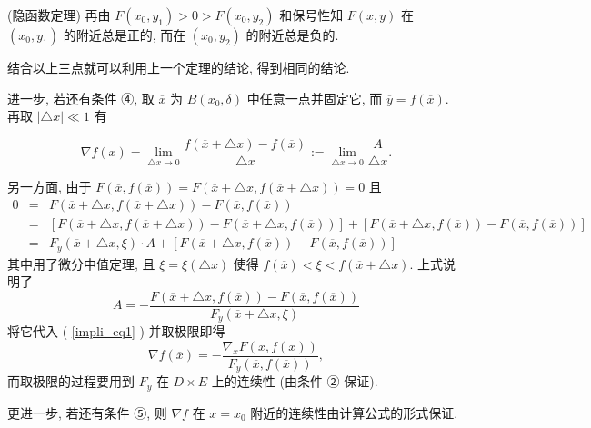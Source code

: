 \begin{theorem}{(隐函数定理)}
再由 $F(x_{0},y_{1})>0>F(x_{0},y_{2})$ 和保号性知 $F(x,y)$ 在 $(x_{0},y_{1})$
的附近总是正的, 而在 $(x_{0},y_{2})$ 的附近总是负的. 

结合以上三点就可以利用上一个定理的结论, 得到相同的结论. 

进一步, 若还有条件 ④, 取 \textbf{$\overline{x}$ }为 $B(x_{0},\delta)$ 中任意一点并固定它,
而 $\overline{y}=f(\overline{x})$. 再取 $\left|\triangle x\right|\ll1$
有

\begin{equation}\label{impli_eq1}
\nabla f(x)={\displaystyle {\displaystyle \lim_{\triangle x\rightarrow0}}\frac{f(\overline{x}+\triangle x)-f(\overline{x})}{\triangle x}:={\displaystyle \lim_{\triangle x\rightarrow0}}\frac{A}{\triangle x}}.
\end{equation}

另一方面, 由于 $F(\overline{x},f(\overline{x}))=F(\overline{x}+\triangle x,f(\overline{x}+\triangle x))=0$
且
$$
\begin{eqnarray*}
0 & = & F(\overline{x}+\triangle x,f(\overline{x}+\triangle x))-F(\overline{x},f(\overline{x}))\\
 & = & \left[F(\overline{x}+\triangle x,f(\overline{x}+\triangle x))-F(\overline{x}+\triangle x,f(\overline{x}))\right]+\left[F(\overline{x}+\triangle x,f(\overline{x}))-F(\overline{x},f(\overline{x}))\right]\\
 & = & F_{y}(\overline{x}+\triangle x,\xi)\cdot A+\left[F(\overline{x}+\triangle x,f(\overline{x}))-F(\overline{x},f(\overline{x}))\right]
\end{eqnarray*}
$$
其中用了微分中值定理, 且 $\xi=\xi(\triangle x)$ 使得 $f(\overline{x})<\xi<f(\overline{x}+\triangle x)$.
上式说明了 
\[
A=-{\displaystyle \frac{F(\overline{x}+\triangle x,f(\overline{x}))-F(\overline{x},f(\overline{x}))}{F_{y}(\overline{x}+\triangle x,\xi)}}
\]
将它代入 ( \autoref{impli_eq1} ) 并取极限即得 
\begin{equation}\label{impli_eq2}
\nabla f(\overline{x})=-{\displaystyle \frac{\nabla_{x}F(\overline{x},f(\overline{x}))}{F_{y}(\overline{x},f(\overline{x}))},}
\end{equation}
而取极限的过程要用到 $F_{y}$ 在 $D\times E$ 上的连续性 (由条件 ② 保证). 

更进一步, 若还有条件 ⑤, 则 $\nabla f$ 在 $x=x_{0}$ 附近的连续性由计算公式的形式保证. 
 \end{theorem}


